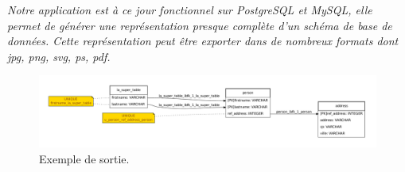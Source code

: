\textit{Notre application est à ce jour fonctionnel sur PostgreSQL et MySQL, elle permet de générer une représentation presque complète d'un schéma de base de données. Cette représentation peut être exporter dans de nombreux formats dont jpg, png, svg, ps, pdf.}


\begin{figure}[H]
\centering
\includegraphics[width=\textwidth]{files/exemple_sortie}
\caption{Exemple de sortie.}
\end{figure}